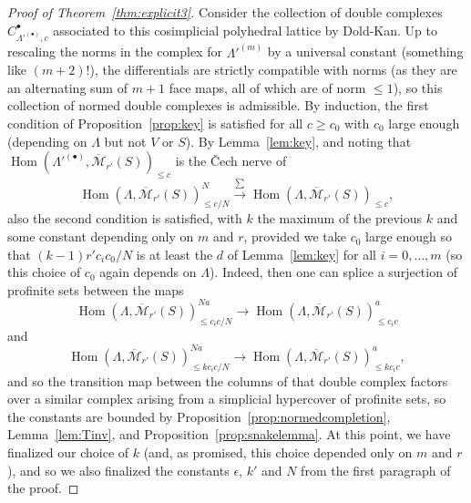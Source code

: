 \documentclass[11pt]{amsart}
\DeclareMathOperator{\Hom}{Hom}
\numberwithin{equation}{section}
\numberwithin{theorem}{section}
\theoremstyle{definition}
\begin{document}
\begin{proof}[Proof of Theorem~\ref{thm:explicit3}]
Consider the collection of double complexes $C_{\Lambda'^{(\bullet)},c}^\bullet$ associated to this cosimplicial polyhedral lattice by Dold-Kan. Up to rescaling the norms in the complex for $\Lambda'^{(m)}$ by a universal constant (something like $(m+2)!$), the differentials are strictly compatible with norms (as they are an alternating sum of $m+1$ face maps, all of which are of norm $\leq 1$), so this collection of normed double complexes is admissible. By induction, the first condition of Proposition~\ref{prop:key} is satisfied for all $c\geq c_0$ with $c_0$ large enough (depending on $\Lambda$ but not $V$ or $S$). By Lemma~\ref{lem:key}, and noting that $\Hom(\Lambda'^{(\bullet)},\overline{\mathcal M}_{r'}(S))_{\leq c}$ is the \v{C}ech nerve of
\[
\Hom(\Lambda,\overline{\mathcal M}_{r'}(S))_{\leq c/N}^N\xrightarrow{\sum} \Hom(\Lambda,\overline{\mathcal M}_{r'}(S))_{\leq c},
\]
also the second condition is satisfied, with $k$ the maximum of the previous $k$ and some constant depending only on $m$ and $r$, provided we take $c_0$ large enough so that $(k-1)r'c_ic_0/N$ is at least the $d$ of Lemma~\ref{lem:key} for all $i=0,\ldots,m$ (so this choice of $c_0$ again depends on $\Lambda$). Indeed, then one can splice a surjection of profinite sets between the maps
\[
\Hom(\Lambda,\overline{\mathcal M}_{r'}(S))_{\leq c_ic/N}^{Na}\to\Hom(\Lambda,\overline{\mathcal M}_{r'}(S))_{\leq c_ic}^a
\]
and
\[
\Hom(\Lambda,\overline{\mathcal M}_{r'}(S))_{\leq kc_ic/N}^{Na}\to \Hom(\Lambda,\overline{\mathcal M}_{r'}(S))_{\leq kc_ic}^a,
\]
and so the transition map between the columns of that double complex factors over a similar complex arising from a simplicial hypercover of profinite sets, so the constants are bounded by Proposition~\ref{prop:normedcompletion}, Lemma~\ref{lem:Tinv}, and Proposition~\ref{prop:snakelemma}. At this point, we have finalized our choice of $k$ (and, as promised, this choice depended only on $m$ and $r$), and so we also finalized the constants $\epsilon$, $k'$ and $N$ from the first paragraph of the proof.


\end{proof}
\end{document}
